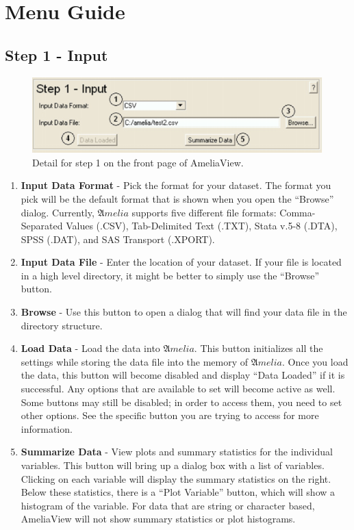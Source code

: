 \documentclass[12pt,titlepage]{article}
\begin{document}
\section{Menu Guide}
\label{sec:menu}

\subsection{Step 1 - Input}
\label{sec:step1}
\begin{figure}[ht]
  \centering \includegraphics[scale=.75]{step1}
  \caption{Detail for step 1 on the front page of AmeliaView.}
\end{figure}
\begin{enumerate}
\item \textbf{Input Data Format} - Pick the format for your dataset.
  The format you pick will be the default format that is shown when
  you open the ``Browse'' dialog.  Currently, ${\mathfrak Amelia}$
  supports five different file formats: Comma-Separated Values (.CSV),
  Tab-Delimited Text (.TXT), Stata v.5-8 (.DTA), SPSS (.DAT), and SAS
  Transport (.XPORT).
\item \textbf{Input Data File} - Enter the location of your dataset.
  If your file is located in a high level directory, it might be
  better to simply use the ``Browse'' button.
\item \textbf{Browse} - Use this button to open a dialog that will
  find your data file in the directory structure.
\item \textbf{Load Data} - Load the data into ${\mathfrak Amelia}$.
  This button initializes all the settings while storing the data file
  into the memory of ${\mathfrak Amelia}$.  Once you load the data,
  this button will become disabled and display ``Data Loaded'' if it
  is successful.  Any options that are available to set will become
  active as well.  Some buttons may still be disabled; in order to
  access them, you need to set other options.  See the specific button
  you are trying to access for more information.
\item \textbf{Summarize Data} - View plots and summary statistics for
  the individual variables.  This button will bring up a dialog box
  with a list of variables.  Clicking on each variable will display
  the summary statistics on the right.  Below these statistics, there
  is a ``Plot Variable'' button, which will show a histogram of the
  variable.  For data that are string or character based, AmeliaView
  will not show summary statistics or plot histograms.
\end{enumerate}
\end{document}
